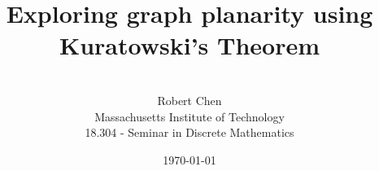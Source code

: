 


\title{
Exploring graph planarity using Kuratowski's Theorem}


\author{
\vspace{0.5in}\\
Robert Chen\\
Massachusetts Institute of Technology\\
18.304 - Seminar in Discrete Mathematics
\vspace{1in}
}


\date{
\today
}

